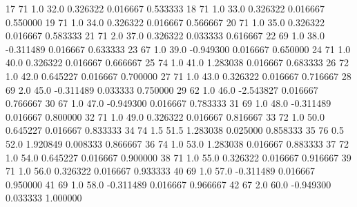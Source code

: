 \documentclass[letterpaper,10pt,english]{sphinxmanual}
\begin{document}
{\begin{sphinxVerbatim}[commandchars=\\\{\}]
17          71       1.0   32.0         0.326322       0.016667    0.533333
18          71       1.0   33.0         0.326322       0.016667    0.550000
19          71       1.0   34.0         0.326322       0.016667    0.566667
20          71       1.0   35.0         0.326322       0.016667    0.583333
21          71       2.0   37.0         0.326322       0.033333    0.616667
22          69       1.0   38.0        -0.311489       0.016667    0.633333
23          67       1.0   39.0        -0.949300       0.016667    0.650000
24          71       1.0   40.0         0.326322       0.016667    0.666667
25          74       1.0   41.0         1.283038       0.016667    0.683333
26          72       1.0   42.0         0.645227       0.016667    0.700000
27          71       1.0   43.0         0.326322       0.016667    0.716667
28          69       2.0   45.0        -0.311489       0.033333    0.750000
29          62       1.0   46.0        -2.543827       0.016667    0.766667
30          67       1.0   47.0        -0.949300       0.016667    0.783333
31          69       1.0   48.0        -0.311489       0.016667    0.800000
32          71       1.0   49.0         0.326322       0.016667    0.816667
33          72       1.0   50.0         0.645227       0.016667    0.833333
34          74       1.5   51.5         1.283038       0.025000    0.858333
35          76       0.5   52.0         1.920849       0.008333    0.866667
36          74       1.0   53.0         1.283038       0.016667    0.883333
37          72       1.0   54.0         0.645227       0.016667    0.900000
38          71       1.0   55.0         0.326322       0.016667    0.916667
39          71       1.0   56.0         0.326322       0.016667    0.933333
40          69       1.0   57.0        -0.311489       0.016667    0.950000
41          69       1.0   58.0        -0.311489       0.016667    0.966667
42          67       2.0   60.0        -0.949300       0.033333    1.000000
\end{sphinxVerbatim}
}

{
\begin{sphinxVerbatim}[commandchars=\\\{\}]
\llap{\color{nbsphinxin}[47]:\,\hspace{\fboxrule}\hspace{\fboxsep}}   
  
\end{sphinxVerbatim}
}
\end{document}
